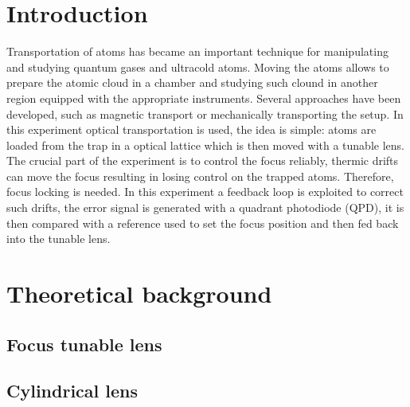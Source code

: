 \documentclass[a4paper,10pt]{article}
\begin{document}
\section{Introduction}
Transportation of atoms has became an important technique for manipulating and studying quantum gases and ultracold atoms. Moving the atoms allows to prepare the atomic cloud in a chamber and studying such clound in another region equipped with the appropriate instruments. Several approaches have been developed, such as magnetic transport or mechanically transporting the setup. In this experiment optical transportation is used, the idea is simple: atoms are loaded from the trap in a optical lattice which is then moved with a tunable lens. The crucial part of the experiment is to control the focus reliably, thermic drifts can move the focus resulting in losing control on the trapped atoms. Therefore, focus locking is needed. In this experiment a feedback loop is exploited to correct such drifts, the error signal is generated with a quadrant photodiode (QPD), it is then compared with a reference used to set the focus position and then fed back into the tunable lens.

\section{Theoretical background}
\subsection{Focus tunable lens}
\subsection{Cylindrical lens}
\end{document}
